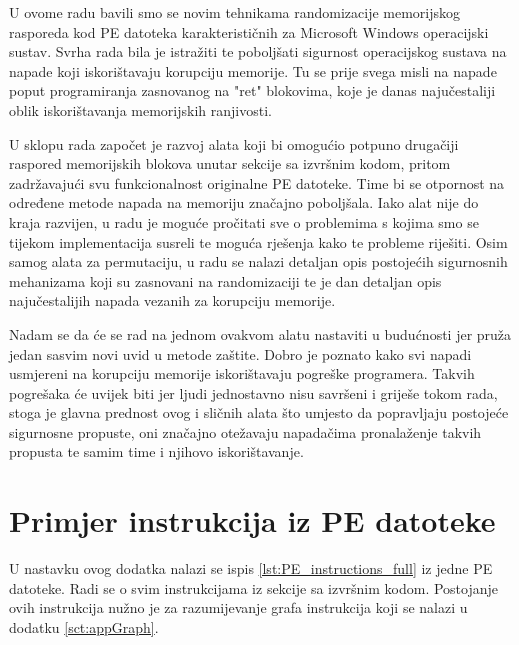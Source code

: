 \documentclass[times, utf8, diplomski, numeric]{fer}
\begin{document}
U ovome radu bavili smo se novim tehnikama randomizacije
memorijskog rasporeda kod PE datoteka karakterističnih za
Microsoft Windows operacijski sustav. Svrha rada bila je
istražiti te poboljšati sigurnost operacijskog sustava na napade
koji iskorištavaju korupciju memorije. Tu se prije svega misli na
napade poput programiranja zasnovanog na "ret" blokovima, koje je
danas najučestaliji oblik iskorištavanja memorijskih ranjivosti.

U sklopu rada započet je razvoj alata koji bi omogućio potpuno
drugačiji raspored memorijskih blokova unutar sekcije sa izvršnim
kodom, pritom zadržavajući svu funkcionalnost originalne PE
datoteke. Time bi se otpornost na određene metode napada na
memoriju značajno poboljšala. Iako alat nije do kraja razvijen, u
radu je moguće pročitati sve o problemima s kojima smo se tijekom
implementacija susreli te moguća rješenja kako te probleme
riješiti. Osim samog alata za permutaciju, u radu se nalazi
detaljan opis postojećih sigurnosnih mehanizama koji su zasnovani
na randomizaciji te je dan detaljan opis najučestalijih napada
vezanih za korupciju memorije.

Nadam se da će se rad na jednom ovakvom alatu nastaviti u
budućnosti jer pruža jedan sasvim novi uvid u metode zaštite.
Dobro je poznato kako svi napadi usmjereni na korupciju memorije
iskorištavaju pogreške programera. Takvih pogrešaka će uvijek
biti jer ljudi jednostavno nisu savršeni i griješe tokom rada,
stoga je glavna prednost ovog i sličnih alata što umjesto da
popravljaju postojeće sigurnosne propuste, oni značajno otežavaju
napadačima pronalaženje takvih propusta te samim time i njihovo
iskorištavanje.


\nocite{*}


\appendix

\chapter{Primjer instrukcija iz PE datoteke}
\label{sct:appPE}

U nastavku ovog dodatka nalazi se ispis 
\ref{lst:PE_instructions_full} iz jedne PE datoteke. Radi se o
svim instrukcijama iz sekcije sa izvršnim kodom. Postojanje ovih
instrukcija nužno je za razumijevanje grafa instrukcija koji se
nalazi u dodatku \ref{sct:appGraph}.
\end{document}
